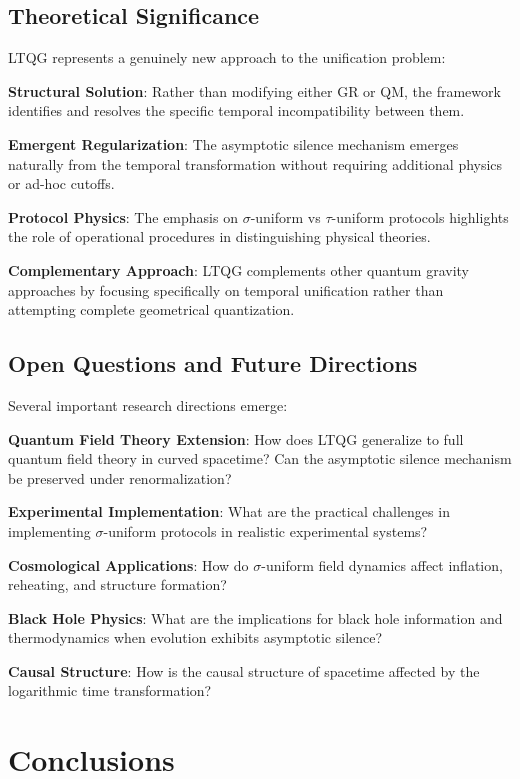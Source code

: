 \documentclass[12pt,a4paper]{article}
\begin{document}
\subsection{Theoretical Significance}

LTQG represents a genuinely new approach to the unification problem:

\textbf{Structural Solution}: Rather than modifying either GR or QM, the framework identifies and resolves the specific temporal incompatibility between them.

\textbf{Emergent Regularization}: The asymptotic silence mechanism emerges naturally from the temporal transformation without requiring additional physics or ad-hoc cutoffs.

\textbf{Protocol Physics}: The emphasis on $\sigma$-uniform vs $\tau$-uniform protocols highlights the role of operational procedures in distinguishing physical theories.

\textbf{Complementary Approach}: LTQG complements other quantum gravity approaches by focusing specifically on temporal unification rather than attempting complete geometrical quantization.

\subsection{Open Questions and Future Directions}

Several important research directions emerge:

\textbf{Quantum Field Theory Extension}: How does LTQG generalize to full quantum field theory in curved spacetime? Can the asymptotic silence mechanism be preserved under renormalization?

\textbf{Experimental Implementation}: What are the practical challenges in implementing $\sigma$-uniform protocols in realistic experimental systems?

\textbf{Cosmological Applications}: How do $\sigma$-uniform field dynamics affect inflation, reheating, and structure formation?

\textbf{Black Hole Physics}: What are the implications for black hole information and thermodynamics when evolution exhibits asymptotic silence?

\textbf{Causal Structure}: How is the causal structure of spacetime affected by the logarithmic time transformation?

\section{Conclusions}
\end{document}
